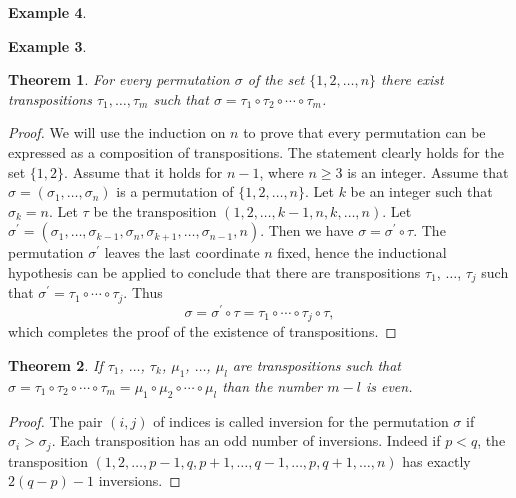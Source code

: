 \documentclass[11pt]{article}
\newtheorem{thm}{Theorem}[section]
\theoremstyle{definition}
\newtheorem{exmp}[thm]{Example}
\theoremstyle{plain}
\begin{document}
\begin{exmp}
\begin{exmp}
\begin{thm}
For every permutation \( \sigma \) of the set \( \{1,2,\dots, n\} \) there exist transpositions \( \tau_1, \dots, \tau_m \) such that \( \sigma=\tau_1\circ \tau_2\circ \cdots \circ\tau_m \).
\end{thm}
\begin{proof}
We will use the induction on \( n \) to prove that every permutation can be expressed as a composition of transpositions. The statement clearly holds for the set \( \{1,2\} \). Assume that it holds for \( n-1 \), where \( n\geq 3 \) is an integer. Assume that \( \sigma=(\sigma_1, \dots, \sigma_n) \) is a permutation of \( \{1,2,\dots, n\} \). Let \( k \) be an integer such that \( \sigma_k=n \). Let \( \tau \) be the transposition \( (1,2,\dots, k-1,n,k,\dots, n) \). Let \( \sigma^{\prime}=(\sigma_1,\dots, \sigma_{k-1},\sigma_n,\sigma_{k+1},\dots, \sigma_{n-1},n) \). Then we have \( \sigma=\sigma^{\prime}\circ \tau \). The permutation \( \sigma^{\prime} \) leaves the last coordinate \( n \) fixed, hence the inductional hypothesis can be applied to conclude that there are transpositions \( \tau_1 \), \( \dots \), \( \tau_j \) such that \( \sigma^{\prime}=\tau_1\circ\cdots\circ \tau_j \). Thus \[ \sigma=\sigma^{\prime}\circ\tau=\tau_1\circ\cdots\circ \tau_j\circ \tau,\] which completes the proof of the existence of transpositions.
\end{proof}

\begin{thm}
If \( \tau_1 \), \( \dots \), \( \tau_k \), \( \mu_1 \), \( \dots \), \( \mu_l \) are transpositions such that \( \sigma=\tau_1\circ \tau_2\circ \cdots \circ\tau_m= \mu_1\circ \mu_2\circ\cdots\circ \mu_l \) than the number \( m-l \) is even.
\end{thm}
\begin{proof}
The pair \( (i,j) \) of indices is called inversion for the permutation \( \sigma \) if \( \sigma_i> \sigma_j \). Each transposition has an odd number of inversions. Indeed if \( p< q \), the transposition \( (1,2,\dots,p-1, q,p+1, \dots, q-1,\dots, p, q+1,\dots, n) \) has exactly \( 2(q-p)-1 \) inversions.


\end{proof}
\end{exmp}
\end{exmp}
\end{document}
